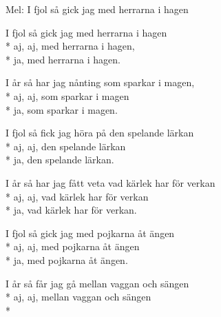 \begin{SongText}
    \begin{SongInfo}
        Mel: I fjol så gick jag med herrarna i hagen
    \end{SongInfo}
    \begin{SongVerse}
        I fjol så gick jag med herrarna i hagen\\*%
        aj, aj, med herrarna i hagen,\\*%
        ja, med herrarna i hagen.
    \end{SongVerse}
    \begin{SongVerse}
        I år så har jag nånting som sparkar i magen,\\*%
        aj, aj, som sparkar i magen\\*%
        ja, som sparkar i magen.
    \end{SongVerse}
    \begin{SongVerse}
        I fjol så fick jag höra på den spelande lärkan\\*%
        aj, aj, den spelande lärkan\\*%
        ja, den spelande lärkan.
    \end{SongVerse}
    \begin{SongVerse}
        I år så har jag fått veta vad kärlek har för verkan\\*%
        aj, aj, vad kärlek har för verkan\\*%
        ja, vad kärlek har för verkan.
    \end{SongVerse}
    \begin{SongVerse}
        I fjol så gick jag med pojkarna åt ängen\\*%
        aj, aj, med pojkarna åt ängen\\*%
        ja, med pojkarna åt ängen.
    \end{SongVerse}
    \begin{SongVerse}
        I år så får jag gå mellan vaggan och sängen\\*%
        aj, aj, mellan vaggan och sängen\\*%

\end{SongVerse}
\end{SongText}
